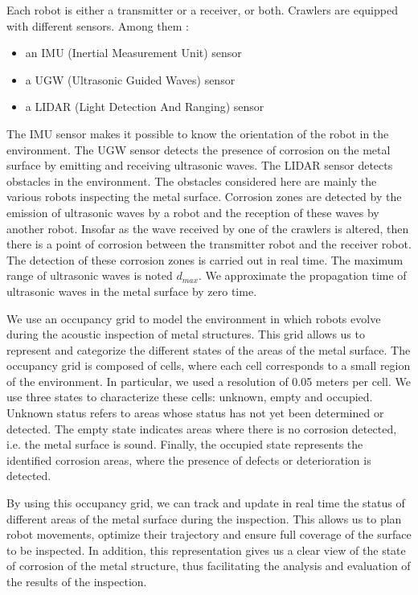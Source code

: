 \documentclass[english,RandD]{rapportPFE}  %
\begin{document}
			Each robot is either a transmitter or a receiver, or both.
			Crawlers are equipped with different sensors.
			Among them :
			\begin{itemize}
				\item an IMU (Inertial Measurement Unit) sensor
				\item a UGW (Ultrasonic Guided Waves) sensor
				\item a LIDAR (Light Detection And Ranging) sensor
			\end{itemize}
			The IMU sensor makes it possible to know the orientation of the robot in the environment.
			The UGW sensor detects the presence of corrosion on the metal surface by emitting and receiving ultrasonic waves.
			The LIDAR sensor detects obstacles in the environment.
			The obstacles considered here are mainly the various robots inspecting the metal surface.
			Corrosion zones are detected by the emission of ultrasonic waves by a robot and the reception of these waves by another robot.
			Insofar as the wave received by one of the crawlers is altered, then there is a point of corrosion between the transmitter robot and the receiver robot.
			The detection of these corrosion zones is carried out in real time.
			The maximum range of ultrasonic waves is noted $d_{max}$.
			We approximate the propagation time of ultrasonic waves in the metal surface by zero time.

			We use an occupancy grid to model the environment in which robots evolve during the acoustic inspection of metal structures.
			This grid allows us to represent and categorize the different states of the areas of the metal surface.
			The occupancy grid is composed of cells, where each cell corresponds to a small region of the environment.
			In particular, we used a resolution of 0.05 meters per cell.
			We use three states to characterize these cells: unknown, empty and occupied.
			Unknown status refers to areas whose status has not yet been determined or detected.
			The empty state indicates areas where there is no corrosion detected, i.e. the metal surface is sound.
			Finally, the occupied state represents the identified corrosion areas, where the presence of defects or deterioration is detected.

			By using this occupancy grid, we can track and update in real time the status of different areas of the metal surface during the inspection.
			This allows us to plan robot movements, optimize their trajectory and ensure full coverage of the surface to be inspected.
			In addition, this representation gives us a clear view of the state of corrosion of the metal structure, thus facilitating the analysis and evaluation of the results of the inspection.
\end{document}

